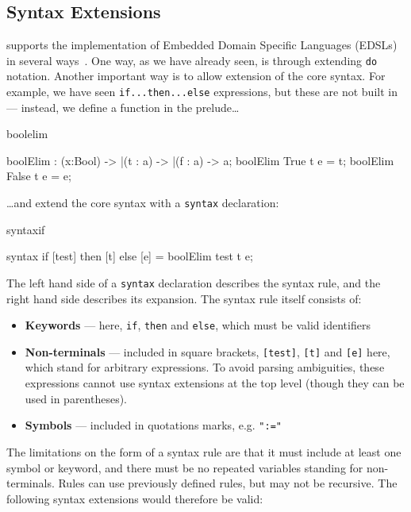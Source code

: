 \subsection{Syntax Extensions}

\Idris{} supports the implementation of Embedded Domain Specific Languages (EDSLs) in
several ways~\cite{res-dsl-padl12}. One way, as we have already seen, is through
extending \texttt{do} notation. Another important way is to allow extension of the core
syntax. For example, we have seen \texttt{if...then...else} expressions, but these
are not built in --- instead, we define a function in the prelude\ldots

\begin{SaveVerbatim}{boolelim}

boolElim : (x:Bool) -> |(t : a) -> |(f : a) -> a; 
boolElim True  t e = t;
boolElim False t e = e;

\end{SaveVerbatim}

\noindent
\ldots and extend the core syntax with a \texttt{syntax} declaration:

\begin{SaveVerbatim}{syntaxif}

syntax if [test] then [t] else [e] = boolElim test t e;

\end{SaveVerbatim}

\noindent
The left hand side of a \texttt{syntax} declaration describes the syntax rule, and the right
hand side describes its expansion. The syntax rule itself consists of:

\begin{itemize}
\item \textbf{Keywords} --- here, \texttt{if}, \texttt{then} and \texttt{else}, which must
be valid identifiers
\item \textbf{Non-terminals} --- included in square brackets, \texttt{[test]}, \texttt{[t]}
and \texttt{[e]} here, which stand for arbitrary expressions. To avoid parsing ambiguities, 
these expressions cannot use syntax extensions at the top level (though they can be used
in parentheses).
\item \textbf{Symbols} --- included in quotations marks, e.g. \texttt{":="}
\end{itemize}

\noindent
The limitations on the form of a syntax rule are that it must include at least one
symbol or keyword, and there must be no repeated variables standing for non-terminals.
Rules can use previously defined rules, but may not be recursive.
The following syntax extensions would therefore be valid:

